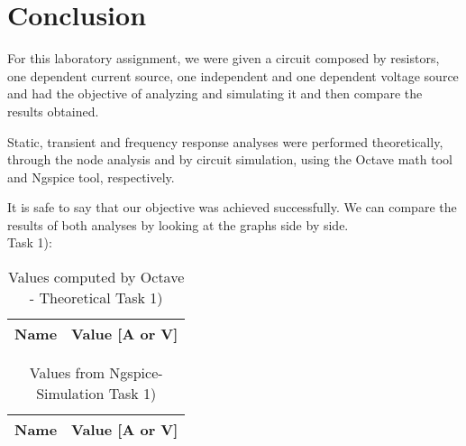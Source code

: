 
\section{Conclusion}
\label{sec:conclusion}


For this laboratory assignment, we were given a circuit composed by resistors, one dependent current source,
one independent and one dependent voltage source and had the objective of analyzing and simulating it and
then compare the results obtained.

Static, transient and frequency response analyses were performed theoretically, through the node analysis
and by circuit simulation, using the Octave math tool and Ngspice tool, respectively. 

It is safe to say that our objective was achieved successfully. We can compare the results of both
analyses by looking at the graphs side by side.  \\

Task 1):

\begin{table}[ht]
	\centering
	\begin{tabular}{|l|r|}
    		\hline    
    		{\bf Name} & {\bf Value [A or V]} \\ \hline
    		
  	\end{tabular}
  	\caption{Values computed by Octave - Theoretical Task 1)}
 
\label{tab:node}
\end{table}

\begin{table}[ht]
	\centering
	\begin{tabular}{|l|r|}
		\hline    
		{\bf Name} & {\bf Value [A or V]} \\ \hline
    		
	\end{tabular}
	
	\caption{Values from Ngspice- Simulation Task 1)}
    
\label{tab:op1}
\end{table}

